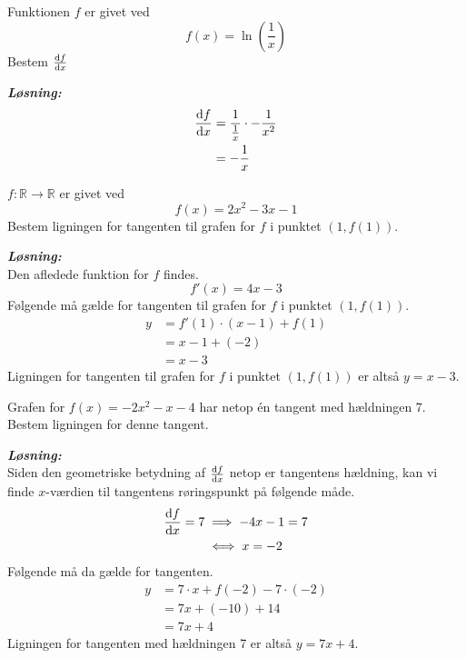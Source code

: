 \documentclass{article}
\newcommand{\sol}{\setlength{\parindent}{0cm}\textbf{\textit{Løsning:}}\setlength{\parindent}{1cm}}
\begin{document}
\begin{question}{}{}
 Funktionen $f$ er givet ved 
\[
  f(x)=\ln(\frac{1}{x})
\] 
Bestem $\dv{f}{x}$   
\end{question}
\sol 
\begin{equation*}
\begin{split}
  \dv{f}{x}&=\frac{1}{\frac{1}{x}}\cdot - \frac{1}{x^2} \\
  &=-\frac{1}{x} 
\end{split}
\end{equation*}

\begin{question}{}{}
$f:\mathbb{R} \to \mathbb{R}$ er givet ved 
\[
f(x)= 2x^2-3x-1
\] 
  Bestem ligningen for tangenten til grafen for $f$ i punktet $(1,f(1))$. 
\end{question}
\sol \\ 
Den afledede funktion for $f$ findes.
\[
f'(x)=4x-3
\] 
Følgende må gælde for tangenten til grafen for $f$ i punktet $(1,f(1))$. 
\begin{equation*}
\begin{split}
  y&=f'(1)\cdot(x-1)+f(1)\\ 
  &= x-1 + (-2)\\ 
  &= x-3
\end{split}
\end{equation*}
Ligningen for tangenten til grafen for $f$ i punktet $(1,f(1))$ er altså $y=x-3$.

\begin{question}{}{}
  Grafen for $f(x)=-2x^2-x-4$ har netop én tangent med hældningen 7. 
  Bestem ligningen for denne tangent.
\end{question}
\sol \\ 
Siden den geometriske betydning af $\dv{f}{x}$ netop er tangentens hældning, kan vi finde $x$-værdien til tangentens røringspunkt på følgende måde.
\begin{equation*}
\begin{split}
  \dv{f}{x}=7 &\implies -4x-1=7\\ 
  &\iff x=-2
\end{split}
\end{equation*}
Følgende må da gælde for tangenten.
\begin{equation*}
\begin{split}
  y&=7\cdot x + f(-2)-7\cdot(-2)\\ 
  &=7x + (-10) +14\\ 
  &= 7x + 4
\end{split}
\end{equation*}
Ligningen for tangenten med hældningen 7 er altså $y=7x+4$.
\end{document}
